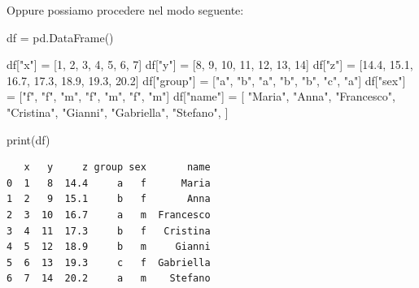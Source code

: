 \documentclass[
  letterpaper,
  krantz2]{{[}./krantz{]}}
\newenvironment{Shaded}{\begin{snugshade}}{\end{snugshade}}
\newcommand{\BuiltInTok}[1]{\textcolor[rgb]{0.00,0.23,0.31}{#1}}
\newcommand{\DecValTok}[1]{\textcolor[rgb]{0.68,0.00,0.00}{#1}}
\newcommand{\FloatTok}[1]{\textcolor[rgb]{0.68,0.00,0.00}{#1}}
\newcommand{\NormalTok}[1]{\textcolor[rgb]{0.00,0.23,0.31}{#1}}
\newcommand{\OperatorTok}[1]{\textcolor[rgb]{0.37,0.37,0.37}{#1}}
\newcommand{\StringTok}[1]{\textcolor[rgb]{0.13,0.47,0.30}{#1}}
\begin{document}
Oppure possiamo procedere nel modo seguente:

\begin{Shaded}
\begin{Highlighting}[]
\NormalTok{df }\OperatorTok{=}\NormalTok{ pd.DataFrame()}

\NormalTok{df[}\StringTok{"x"}\NormalTok{] }\OperatorTok{=}\NormalTok{ [}\DecValTok{1}\NormalTok{, }\DecValTok{2}\NormalTok{, }\DecValTok{3}\NormalTok{, }\DecValTok{4}\NormalTok{, }\DecValTok{5}\NormalTok{, }\DecValTok{6}\NormalTok{, }\DecValTok{7}\NormalTok{]}
\NormalTok{df[}\StringTok{"y"}\NormalTok{] }\OperatorTok{=}\NormalTok{ [}\DecValTok{8}\NormalTok{, }\DecValTok{9}\NormalTok{, }\DecValTok{10}\NormalTok{, }\DecValTok{11}\NormalTok{, }\DecValTok{12}\NormalTok{, }\DecValTok{13}\NormalTok{, }\DecValTok{14}\NormalTok{]}
\NormalTok{df[}\StringTok{"z"}\NormalTok{] }\OperatorTok{=}\NormalTok{ [}\FloatTok{14.4}\NormalTok{, }\FloatTok{15.1}\NormalTok{, }\FloatTok{16.7}\NormalTok{, }\FloatTok{17.3}\NormalTok{, }\FloatTok{18.9}\NormalTok{, }\FloatTok{19.3}\NormalTok{, }\FloatTok{20.2}\NormalTok{]}
\NormalTok{df[}\StringTok{"group"}\NormalTok{] }\OperatorTok{=}\NormalTok{ [}\StringTok{"a"}\NormalTok{, }\StringTok{"b"}\NormalTok{, }\StringTok{"a"}\NormalTok{, }\StringTok{"b"}\NormalTok{, }\StringTok{"b"}\NormalTok{, }\StringTok{"c"}\NormalTok{, }\StringTok{"a"}\NormalTok{]}
\NormalTok{df[}\StringTok{"sex"}\NormalTok{] }\OperatorTok{=}\NormalTok{ [}\StringTok{"f"}\NormalTok{, }\StringTok{"f"}\NormalTok{, }\StringTok{"m"}\NormalTok{, }\StringTok{"f"}\NormalTok{, }\StringTok{"m"}\NormalTok{, }\StringTok{"f"}\NormalTok{, }\StringTok{"m"}\NormalTok{]}
\NormalTok{df[}\StringTok{"name"}\NormalTok{] }\OperatorTok{=}\NormalTok{ [}
    \StringTok{"Maria"}\NormalTok{,}
    \StringTok{"Anna"}\NormalTok{,}
    \StringTok{"Francesco"}\NormalTok{,}
    \StringTok{"Cristina"}\NormalTok{,}
    \StringTok{"Gianni"}\NormalTok{,}
    \StringTok{"Gabriella"}\NormalTok{,}
    \StringTok{"Stefano"}\NormalTok{,}
\NormalTok{]}

\BuiltInTok{print}\NormalTok{(df)}
\end{Highlighting}
\end{Shaded}

\begin{verbatim}
   x   y     z group sex       name
0  1   8  14.4     a   f      Maria
1  2   9  15.1     b   f       Anna
2  3  10  16.7     a   m  Francesco
3  4  11  17.3     b   f   Cristina
4  5  12  18.9     b   m     Gianni
5  6  13  19.3     c   f  Gabriella
6  7  14  20.2     a   m    Stefano
\end{verbatim}
\end{document}
